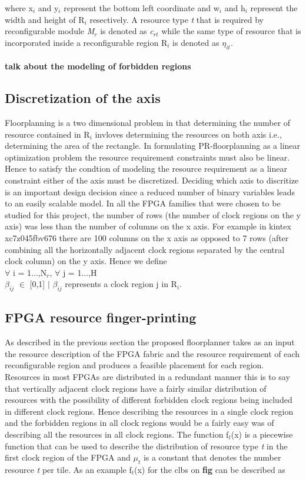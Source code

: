 where x$_i$ and y$_i$ represent the bottom left coordinate and w$_i$ and h$_i$ represent the width and height of R$_i$ resectively. A resource type \textit{t} that is required by reconfigurable module \textit{M$_r$} is denoted as \textit{c$_{rt}$} while the same type of resource that is incorporated inside a reconfigurable region R$_i$ is denoted as $\eta_{it}$.\\ 

\textbf{\\talk about the modeling of forbidden regions}

\subsection{Discretization of the axis}
Floorplanning is a two dimensional problem in that determining the number of resource contained in R$_i$ invloves determining the resources on both axis i.e., determining the area of the rectangle. In formulating PR-floorplanning as a linear optimization problem the resource requirement constraints must also be linear. Hence to satisfy the condtion of modeling the resource requirement as a linear constraint either of the axis must be discretized. Deciding which axis to discritize is an important design decision since a reduced number of binary variables leads to an easily scalable model. In all the FPGA families that were chosen to be studied for this project, the number of rows (the number of clock regions on the y axis) was less than the number of columns on the x axis. For example in kintex xc7z045fbv676 there are 100 columns on the x axis as opposed to 7 rows (after combining all the horizontally adjacent clock regions separated by the central clock column) on the y axis. Hence we define \\

$\forall$ i = 1...,N$_r$, $\forall$ j = 1...,H \\
$\beta_{ij}$ $\in$ [0,1] $\mid$ $\beta_{ij}$ represents a clock region j in R$_i$. \\

\subsection{FPGA resource finger-printing} 
As described in the previous section the proposed floorplanner takes as an input the resource description of the FPGA fabric and the resource requirement of each reconfigurable region and produces a feasible placement for each region. Resources in most FPGAs are distributed in a redundant manner this is to say that vertically adjacent clock regions have a fairly similar distribution of resources with the possibility of different forbidden clock regions being included in different clock regions. Hence describing the resources in a single clock region and the forbidden regions in all clock regions would be a fairly easy was of describing all the resources in all clock regions. The function f$_t$(x) is a piecewise function that can be used to describe the distribution of resource type \textit{t} in the first clock region of the FPGA and $\mu_t$ is a constant that denotes the number resource \textit{t} per tile. As an example f$_t$(x) for the clbs on \textbf{fig} can be described as 

